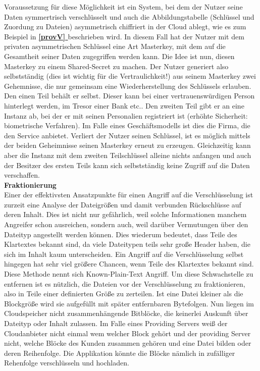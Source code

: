 \documentclass[12pt,a4paper,bibliography=totocnumbered,listof=totocnumbered]{scrartcl}
\newcommand*{\fullref}[1]{\textbf{\hyperref[{#1}]{\ref*{#1} \nameref*{#1}}}}
\begin{document}
Voraussetzung für diese Möglichkeit ist ein System, bei dem der Nutzer seine Daten symmertrisch verschlüsselt und auch die Abbildungstabelle (Schlüssel und Zuordung zu Dateien) asymmetrisch chiffriert in der Cloud ablegt, wie es zum Beispiel in \fullref{provV} beschrieben wird. In diesem Fall hat der Nutzer mit dem privaten asymmetrischen Schlüssel eine Art Masterkey, mit dem auf die Gesamtheit seiner Daten zugegriffen werden kann. Die Idee ist nun, diesen Masterkey zu einem Shared-Secret zu machen. Der Nutzer generiert also selbstständig (dies ist wichtig für die Vertraulichkeit!) aus seinem Masterkey zwei Gehemnisse, die nur gemeinsam eine Wiederherstellung des Schlüssels erlauben. Den einen Teil behält er selbst. Dieser kann bei einer vertrauenswürdigen Person hinterlegt werden, im Tresor einer Bank etc.. Den zweiten Teil gibt er an eine Instanz ab, bei der er mit seinen Personalien registriert ist (erhöhte Sicherheit: biometrische Verfahren). Im Falle eines Geschäftsmodells ist dies die Firma, die den Service anbietet. Verliert der Nutzer seinen Schlüssel, ist es möglich mittels der beiden Geheimnisse seinen Masterkey erneut zu erzeugen. Gleichzeitig kann aber die Instanz mit dem zweiten Teilschlüssel alleine nichts anfangen und auch der Besitzer des ersten Teils kann sich selbstständig keine Zugriff auf die Daten verschaffen. \cite{11}
\\\textbf{Fraktionierung}\\
Einer der effektivsten Ansatzpunkte für einen Angriff auf die Verschlüsselung ist zurzeit eine Analyse der Dateigrößen und damit verbunden Rückschlüsse auf deren Inhalt. Dies ist nicht nur gefährlich, weil solche Informationen manchem Angreifer schon ausreichen, sondern auch, weil darüber Vermutungen über den Dateityp angestellt werden können. Dies wiederum bedeutet, dass Teile des Klartextes bekannt sind, da viele Dateitypen teils sehr große Header haben, die sich im Inhalt kaum unterscheiden. Ein Angriff auf die Verschlüsselung selbst hingegen hat sehr viel größere Chancen, wenn Teile des Klartextes bekannt sind. Diese Methode nennt sich Known-Plain-Text Angriff. Um diese Schwachstelle zu entfernen ist es nützlich, die Dateien vor der Verschlüsselung zu fraktionieren, also in Teile einer definierten Größe zu zerteilen. Ist eine Datei kleiner als die Blockgröße wird sie aufgefüllt mit später entfernbaren Bytefolgen. Nun liegen im Cloudspeicher nicht zusammenhängende Bitblöcke, die keinerlei Auskunft über Dateityp oder Inhalt zulassen. Im Falle eines Providing Servers weiß der Cloudanbieter nicht einmal wem welcher Block gehört und der providing Server nicht, welche Blöcke des Kunden zusammen gehören und eine Datei bilden oder deren Reihenfolge. Die Applikation könnte die Blöcke nämlich in zufälliger Rehenfolge verschlüsseln und hochladen.
\end{document}
